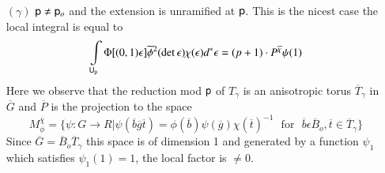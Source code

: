 \begin{itemize}
\item[$(\gamma)$] $\mathsf{p}\neq \mathsf{p}_{o}$ and the extension is unramified at $\mathsf{p}$. This is the nicest case the local integral is equal to
$$
\int\limits_{\mathsf{U}_{\mathsf{p}}}\Phi[(0,1)\epsilon]\widetilde{\phi}^{2}(\det\epsilon)\chi(\epsilon)d^{*}\epsilon=(p+1)\cdot P^{\overline{\chi}}\psi(1)
$$
Here we observe that the reduction mod $\mathsf{p}$ of $T_{\gamma}$ is an anisotropic torus $\overline{T}_{\gamma}$ in $\overline{G}$ and $\overline{P}$ is the projection to the space
$$
M^{\overline{\chi}}_{\phi}=\{\psi:G\to R|\psi(\overline{b}\overline{g}\overline{t})=\phi(\overline{b})\psi(\overline{g})\chi(\overline{t})^{-1}\text{~ for~ } \overline{b}\epsilon \overline{B}_{o},\overline{t}\in \overline{T}_{\gamma}\}
$$
Since $\overline{G}=\overline{B}_{o}\overline{T}_{\gamma}$ this space is of dimension 1 and generated by a function $\psi_{1}$ which satisfies $\psi_{1}(1)=1$, the local factor is $\neq 0$.


\end{itemize}
